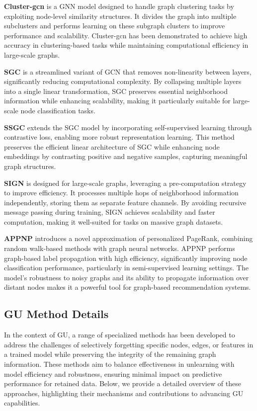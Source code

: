 \textbf{Cluster-gcn} \cite{chiang2019cluster-gcn} is a GNN model designed to handle graph clustering tasks by exploiting node-level similarity structures. It divides the graph into multiple subclusters and performs learning on these subgraph clusters to improve performance and scalability. Cluster-gcn has been demonstrated to achieve high accuracy in clustering-based tasks while maintaining computational efficiency in large-scale graphs.

\textbf{SGC} \cite{wu2019sgc} is a streamlined variant of GCN that removes non-linearity between layers, significantly reducing computational complexity. By collapsing multiple layers into a single linear transformation, SGC preserves essential neighborhood information while enhancing scalability, making it particularly suitable for large-scale node classification tasks.

\textbf{SSGC} \cite{zhu2021ssgc} extends the SGC model by incorporating self-supervised learning through contrastive loss, enabling more robust representation learning. This method preserves the efficient linear architecture of SGC while enhancing node embeddings by contrasting positive and negative samples, capturing meaningful graph structures.

\textbf{SIGN} \cite{frasca2020sign}  is designed for large-scale graphs, leveraging a pre-computation strategy to improve efficiency. It processes multiple hops of neighborhood information independently, storing them as separate feature channels. By avoiding recursive message passing during training, SIGN achieves scalability and faster computation, making it well-suited for tasks on massive graph datasets.

\textbf{APPNP} \cite{2019appnp} introduces a novel approximation of personalized PageRank, combining random walk-based methods with graph neural networks. APPNP performs graph-based label propagation with high efficiency, significantly improving node classification performance, particularly in semi-supervised learning settings. The model’s robustness to noisy graphs and its ability to propagate information over distant nodes makes it a powerful tool for graph-based recommendation systems.


\subsection{GU Method Details}
\label{A.GU}
In the context of GU, a range of specialized methods has been developed to address the challenges of selectively forgetting specific nodes, edges, or features in a trained model while preserving the integrity of the remaining graph information. These methods aim to balance effectiveness in unlearning with model efficiency and robustness, ensuring minimal impact on predictive performance for retained data. Below, we provide a detailed overview of these approaches, highlighting their mechanisms and contributions to advancing GU capabilities.

